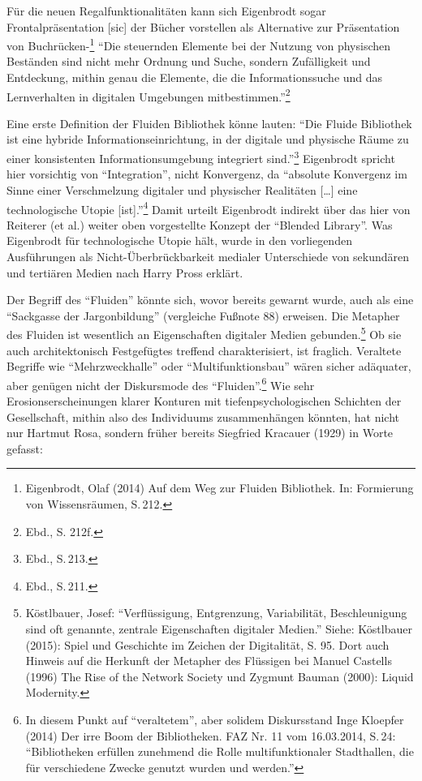 \documentclass[a4paper,
fontsize=11pt,
oneside,
numbers=noperiodatend,
parskip=half-,
bibliography=totoc,
final
]{scrartcl}
\begin{document}
Für die neuen Regalfunktionalitäten kann sich Eigenbrodt sogar
Frontalpräsentation {[}sic{]} der Bücher vorstellen als Alternative zur
Präsentation von Buchrücken-\footnote{Eigenbrodt, Olaf (2014) Auf dem
  Weg zur Fluiden Bibliothek. In: Formierung von Wissensräumen, S.\,212.}
\enquote{Die steuernden Elemente bei der Nutzung von physischen
Beständen sind nicht mehr Ordnung und Suche, sondern Zufälligkeit und
Entdeckung, mithin genau die Elemente, die die Informationssuche und das
Lernverhalten in digitalen Umgebungen mitbestimmen.}\footnote{Ebd., S.
  212f.}

Eine erste Definition der Fluiden Bibliothek könne lauten: \enquote{Die
Fluide Bibliothek ist eine hybride Informationseinrichtung, in der
digitale und physische Räume zu einer konsistenten Informationsumgebung
integriert sind.}\footnote{Ebd., S.\,213.} Eigenbrodt spricht hier
vorsichtig von \enquote{Integration}, nicht Konvergenz, da
\enquote{absolute Konvergenz im Sinne einer Verschmelzung digitaler und
physischer Realitäten {[}\ldots{}{]} eine technologische Utopie
{[}ist{]}.}\footnote{Ebd., S.\,211.} Damit urteilt Eigenbrodt indirekt
über das hier von Reiterer (et al.) weiter oben vorgestellte Konzept der
\enquote{Blended Library}. Was Eigenbrodt für technologische Utopie
hält, wurde in den vorliegenden Ausführungen als Nicht-Überbrückbarkeit
medialer Unterschiede von sekundären und tertiären Medien nach Harry
Pross erklärt.

Der Begriff des \enquote{Fluiden} könnte sich, wovor bereits gewarnt
wurde, auch als eine \enquote{Sackgasse der Jargonbildung} (vergleiche
Fußnote 88) erweisen. Die Metapher des Fluiden ist wesentlich an
Eigenschaften digitaler Medien gebunden.\footnote{Köstlbauer, Josef:
  \enquote{Verflüssigung, Entgrenzung, Variabilität, Beschleunigung sind
  oft genannte, zentrale Eigenschaften digitaler Medien.} Siehe:
  Köstlbauer (2015): Spiel und Geschichte im Zeichen der Digitalität, S.
  95. Dort auch Hinweis auf die Herkunft der Metapher des Flüssigen bei
  Manuel Castells (1996) The Rise of the Network Society und Zygmunt
  Bauman (2000): Liquid Modernity.} Ob sie auch architektonisch
Festgefügtes treffend charakterisiert, ist fraglich. Veraltete Begriffe
wie \enquote{Mehrzweckhalle} oder \enquote{Multifunktionsbau} wären
sicher adäquater, aber genügen nicht der Diskursmode des
\enquote{Fluiden}.\footnote{In diesem Punkt auf \enquote{veraltetem},
  aber solidem Diskursstand Inge Kloepfer (2014) Der irre Boom der
  Bibliotheken. FAZ Nr. 11 vom 16.03.2014, S.\,24: \enquote{Bibliotheken
  erfüllen zunehmend die Rolle multifunktionaler Stadthallen, die für
  verschiedene Zwecke genutzt wurden und werden.}} Wie sehr
Erosionserscheinungen klarer Konturen mit tiefenpsychologischen
Schichten der Gesellschaft, mithin also des Individuums zusammenhängen
könnten, hat nicht nur Hartmut Rosa, sondern früher bereits Siegfried
Kracauer (1929) in Worte gefasst:
\end{document}
